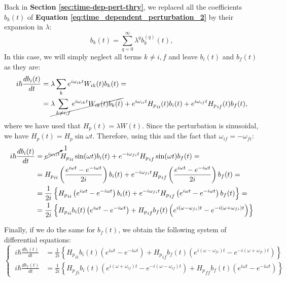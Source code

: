 Back in \textbf{Section \ref{sec:time-dep-pert-thry}}, we replaced all the coefficients $b_k(t)$ of \textbf{Equation \ref{eq:time_dependent_perturbation_2}} by their expansion in $\lambda$:
\begin{equation}
    b_k(t) = \sum_{q=0}^\infty \lambda^q b_k^{(q)}(t),
\end{equation}
In this case, we will simply neglect all terms $k \neq i, f$ and leave $b_i(t)$ and $b_f(t)$ as they are:
\begin{equation}
    \begin{split}
        i \hbar\frac{db_i(t)}{dt} &= \lambda\sum_{k} e^{i\omega_{ik}t}W_{ik}(t)b_k(t) =\\
        &= \cancel{\lambda\sum_{k\neq i,f} e^{i\omega_{ik}t}W_{ik}(t)b_k(t)} + e^{i\omega_{ii}t} {H_p}_{ii}(t)b_i (t) + e^{i\omega_{if}t} {H_p}_{if}(t)b_f (t),
    \end{split}
\end{equation}
where we have used that $H_p(t) = \lambda W(t)$. Since the perturbation is sinusoidal, we have $H_p(t) = H_p \sin \omega t$. Therefore, using this and the fact that $\omega_{if} = -\omega_{fi}$:
\begin{equation}
    \begin{split}
        i \hbar\frac{db_i(t)}{dt} &= \cancelto{1}{e^{i\omega_{ii}t}} {H_p}_{ii}\sin(\omega t)b_i (t) + e^{-i\omega_{fi}t} {H_p}_{if}\sin(\omega t)b_f (t) =\\
        &= {H_p}_{ii}\left(\frac{e^{i\omega t}- e^{-i\omega t}}{2i}\right)b_i (t) + e^{-i\omega_{fi}t} {H_p}_{if}\left(\frac{e^{i\omega t}- e^{-i\omega t}}{2i}\right)b_f (t) =\\
        &= \frac{1}{2i}\left\{{H_p}_{ii}\left(e^{i\omega t}- e^{-i\omega t}\right)b_i (t) + e^{-i\omega_{fi}t} {H_p}_{if}\left(e^{i\omega t}- e^{-i\omega t}\right)b_f (t)\right\} =\\
        &= \frac{1}{2i}\left\{{H_p}_{ii} b_i (t) \left(e^{i\omega t}- e^{-i\omega t}\right) + {H_p}_{if}b_f (t) \left(e^{i(\omega - \omega_{fi}) t}- e^{-i(\omega + \omega_{fi}) t}\right)\right\}\\
    \end{split}
\end{equation}

Finally, if we do the same for $b_f(t)$, we obtain the following system of differential equations:
\begin{equation}
    \left\{\ 
    \begin{aligned}
        i \hbar\frac{db_i(t)}{dt} &= \frac{1}{2i}\left\{{H_p}_{ii} b_i (t) \left(e^{i\omega t}- e^{-i\omega t}\right) + {H_p}_{if}b_f (t) \left(e^{i(\omega - \omega_{fi}) t}- e^{-i(\omega + \omega_{fi}) t}\right)\right\}\\
        i \hbar\frac{db_f(t)}{dt} &= \frac{1}{2i}\left\{{H_p}_{fi}b_i (t) \left(e^{i(\omega + \omega_{if}) t}- e^{-i(\omega - \omega_{if}) t}\right) + {H_p}_{ff} b_f (t) \left(e^{i\omega t}- e^{-i\omega t}\right)\right\}
    \end{aligned}\right.
\end{equation}

